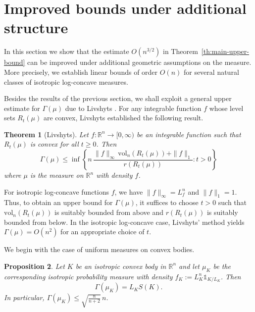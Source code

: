 \documentclass[11pt,leqno]{article}
\newtheorem{theorem}{Theorem}[section]
\newtheorem{proposition}[theorem]{Proposition}
\theoremstyle{remark}
\numberwithin{equation}{section}
\newcommand{\vol}{\mathrm{vol}}
\newcommand{\ls}{\leqslant}
\newcommand{\gr}{\geqslant}
\begin{document}
\section{Improved bounds under additional structure}\label{section:5}

In this section we show that the estimate $O(n^{3/2})$ in Theorem~\ref{th:main-upper-bound} can be improved under additional geometric
assumptions on the measure. More precisely, we establish linear bounds of order $O(n)$ for several natural classes of isotropic log-concave measures.

Besides the results of the previous section, we shall exploit a general upper estimate for $\Gamma(\mu)$ due to Livshyts \cite{Livshyts-2021}. 
For any integrable function $f$ whose level sets $R_t(\mu)$ are convex, Livshyts established the following result.

\begin{theorem}[Livshyts]\label{th:livshyts-1}
Let $f:\mathbb{R}^n\to [0,\infty)$ be an integrable function such that $R_t(\mu)$ is convex for all $t\gr 0$. 
Then
$$\Gamma(\mu)\ls\inf\left\{n\,\frac{\|f\|_{\infty}\,\vol_n(R_t(\mu))+\|f\|_1}{r(R_t(\mu))}:t>0\right\}$$
where $\mu$ is the measure on $\mathbb{R}^n$ with density $f$.
\end{theorem}

For isotropic log-concave functions $f$, we have $\|f\|_{\infty} = L_f^n$ and $\|f\|_1 = 1$.
Thus, to obtain an upper bound for $\Gamma(\mu)$, it suffices to choose $t>0$ such that $\vol_n(R_t(\mu))$ is suitably bounded from above 
and $r(R_t(\mu))$ is suitably bounded from below. 
In the isotropic log-concave case, Livshyts' method yields $\Gamma(\mu) = O(n^2)$ for an appropriate choice of $t$.

\bigskip

We begin with the case of uniform measures on convex bodies. 

\begin{proposition}\label{prop:main-estimate-body-case}
Let $K$ be an isotropic convex body in $\mathbb{R}^n$ and let $\mu_K$ be the corresponding isotropic probability measure
with density $f_K:=L_K^n\mathds{1}_{K/L_K}$. Then
\begin{equation}\label{eq:uniform}
\Gamma(\mu_K)=L_KS(K).
\end{equation}
In particular, $\Gamma(\mu_K)\ls \sqrt{\frac{n}{n+2}}\,n$.
\end{proposition}
\end{document}
